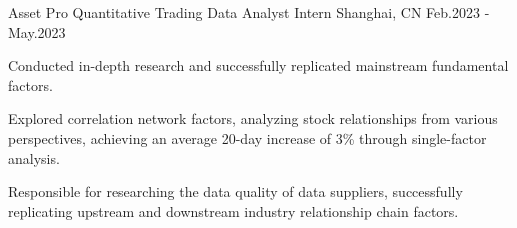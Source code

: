 \begin{cventries}
  \begin{cventry}
    {Asset Pro}
    {Quantitative Trading Data Analyst Intern}
    {Shanghai, CN}
    {Feb.2023 - May.2023}
    {
      \begin{cvitems}
        \item {Conducted in-depth research and successfully replicated mainstream fundamental factors.}
        \item {Explored correlation network factors, analyzing stock relationships from various perspectives, achieving an average 20-day increase of 3\% through single-factor analysis.}
        \item {Responsible for researching the data quality of data suppliers, successfully replicating upstream and downstream industry relationship chain factors.}
      \end{cvitems}
    }
    \end{cventry}

  









\end{cventries}









